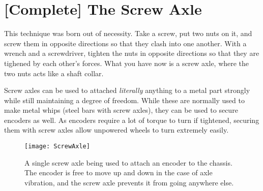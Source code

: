 \section{[Complete] The Screw Axle}

This technique was born out of necessity. Take a screw, put two nuts on it, and screw them in opposite directions so that they clash into one another. With a wrench and a screwdriver, tighten the nuts in opposite directions so that they are tighened by each other's forces. What you have now is a screw axle, where the two nuts acts like a shaft collar.

Screw axles can be used to attached \textit{literally} anything to a metal part strongly while still maintaining a degree of freedom. While these are normally used to make metal whips (steel bars with screw axles), they can be used to secure encoders as well. As encoders require a lot of torque to turn if tightened, securing them with screw axles allow unpowered wheels to turn extremely easily.

\begin{figure}[h]
    \centering
    \texttt{[image: ScrewAxle]}
    \caption{
        A single screw axle being used to attach an encoder to the chassis. The encoder is free to move up and down in the case of axle vibration, and the screw axle prevents it from going anywhere else.
    }
\end{figure}
